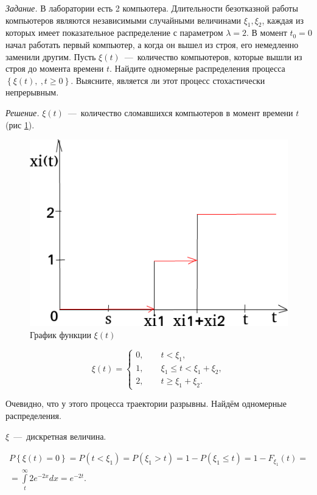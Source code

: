 \textit{Задание.}
В лаборатории есть 2 компьютера.
Длительности безотказной работы компьютеров являются независимыми случайными
величинами $ \xi_1, \xi_2$,
каждая из которых имеет показательное распределение с параметром $ \lambda = 2$.
В момент $t_0 = 0$ начал работать первый компьютер, а когда он вышел из строя,
его немедленно заменили другим.
Пусть $ \xi \left( t \right) $~---~количество компьютеров,
которые вышли из строя до момента времени $t$.
Найдите одномерные распределения процесса
$ \left\{ \xi \left( t \right),\ , t \geq 0 \right\}$.
Выясните, является ли этот процесс стохастически непрерывным.

\textit{Решение.}
$ \xi \left( t \right) $~---~количество сломавшихся компьютеров в момент времени
$t$ (рис \ref{fig:62}).

\begin{figure}[h!]
  \centering
  \includegraphics[width=.4\textwidth]{./pictures/6_2.png}
  \caption{График функции $ \xi \left( t \right) $}
  \label{fig:62}
\end{figure}

\begin{equation*}
  \xi \left( t \right) =
  \begin{cases}
    0, \qquad t < \xi_1, \\
    1, \qquad \xi_1 \leq t < \xi_1 + \xi_2, \\
    2, \qquad t \geq \xi_1 + \xi_2.
  \end{cases}
\end{equation*}

Очевидно, что у этого процесса траектории разрывны.
Найдём одномерные распределения.

$ \xi $~---~дискретная величина.

\begin{gather*}
  P \left\{ \xi \left( t \right) = 0 \right\} =
  P \left( t < \xi_1 \right) =
  P \left( \xi_1 > t \right) =
  1 - P \left( \xi_1 \leq t \right) =
  1 - F_{ \xi_1} \left( t \right) = \\
  = \int \limits_t^{ \infty } 2e^{-2x} dx =
  e^{-2t}.
\end{gather*}

